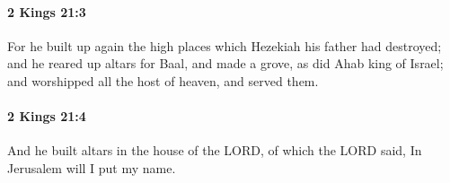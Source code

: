 		\paragraph{2 Kings 21:3} %
			\label{2KINGS-21-3}

			For he built up again the high places which Hezekiah his father had destroyed; and he reared up altars for Baal, and made a grove, as did Ahab king of Israel; and worshipped all the host of heaven, and served them.


		\paragraph{2 Kings 21:4} %
			\label{2KINGS-21-4}

			And he built altars in the house of the LORD, of which the LORD said, In Jerusalem will I put my name.


